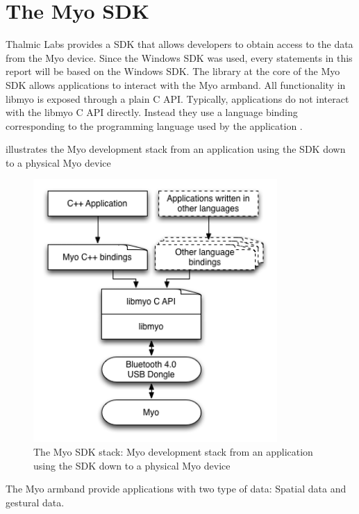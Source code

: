 \section{The Myo SDK}
\label{sec:myoSDK}
Thalmic Labs provides a SDK that allows developers to obtain access to the data from the Myo device. Since the Windows SDK was used, every statements in this report will be based on the Windows SDK. The library at the core of the Myo SDK allows applications to interact with the Myo armband. All functionality in libmyo is exposed through a plain C API. Typically, applications do not interact with the libmyo C API directly. Instead they use a language binding corresponding to the programming language used by the application \cite{myoSDK}.

 illustrates the Myo development stack from an application using the SDK down to a physical Myo device

\begin{figure}[ht]
    \centering
    \includegraphics[height=10cm]{images/myo-sdk-stack.png}
    \caption[The Myo SDK stack]{The Myo SDK stack: Myo development stack from an application using the SDK down to a physical Myo device}
    \label{fig:myoSDKstack}
\end{figure}

The Myo armband provide applications with two type of data: Spatial data and gestural data.

